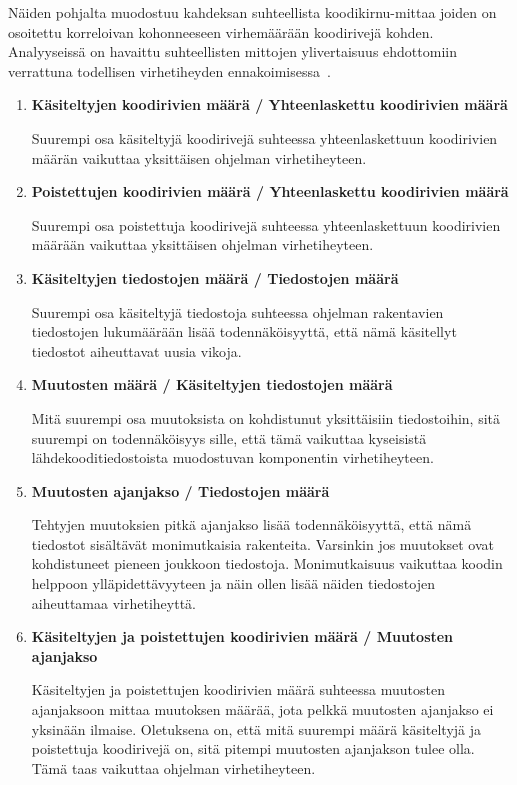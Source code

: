\documentclass[finnish]{../tktltiki2}
\theoremstyle{definition}
\theoremstyle{remark}
\begin{document}
    Näiden pohjalta muodostuu kahdeksan suhteellista koodikirnu-mittaa joiden on osoitettu korreloivan kohonneeseen 
virhemäärään koodirivejä kohden. Analyyseissä on havaittu suhteellisten mittojen ylivertaisuus ehdottomiin verrattuna 
todellisen virhetiheyden ennakoimisessa~\cite{NB05}.

\begin{enumerate}
    
    \item {\bf Käsiteltyjen koodirivien määrä / Yhteenlaskettu koodirivien määrä}
    
    Suurempi osa käsiteltyjä koodirivejä suhteessa yhteenlaskettuun koodirivien määrän vaikuttaa yksittäisen ohjelman 
    virhetiheyteen.
    
    \item {\bf Poistettujen koodirivien määrä / Yhteenlaskettu koodirivien määrä}
    
    Suurempi osa poistettuja koodirivejä suhteessa yhteenlaskettuun koodirivien määrään vaikuttaa yksittäisen ohjelman 
    virhetiheyteen.
    
    \item {\bf Käsiteltyjen tiedostojen määrä / Tiedostojen määrä}
    
    Suurempi osa käsiteltyjä tiedostoja suhteessa ohjelman rakentavien tiedostojen lukumäärään lisää todennäköisyyttä, 
    että nämä käsitellyt tiedostot aiheuttavat uusia vikoja.
    
    \item {\bf Muutosten määrä / Käsiteltyjen tiedostojen määrä}
    
    Mitä suurempi osa muutoksista on kohdistunut yksittäisiin tiedostoihin, sitä suurempi on todennäköisyys sille, että 
    tämä vaikuttaa kyseisistä lähdekooditiedostoista muodostuvan komponentin virhetiheyteen.

    \item {\bf Muutosten ajanjakso / Tiedostojen määrä}
    
    Tehtyjen muutoksien pitkä ajanjakso lisää todennäköisyyttä, että nämä tiedostot sisältävät monimutkaisia rakenteita. 
    Varsinkin jos muutokset ovat kohdistuneet pieneen joukkoon tiedostoja. Monimutkaisuus vaikuttaa koodin helppoon 
    ylläpidettävyyteen ja näin ollen lisää näiden tiedostojen aiheuttamaa virhetiheyttä.

    \item {\bf Käsiteltyjen ja poistettujen koodirivien määrä / Muutosten ajanjakso}
    
    Käsiteltyjen ja poistettujen koodirivien määrä suhteessa muutosten ajanjaksoon mittaa muutoksen määrää, jota pelkkä 
    muutosten ajanjakso ei yksinään ilmaise. Oletuksena on, että mitä suurempi määrä käsiteltyjä ja poistettuja 
    koodirivejä on, sitä pitempi muutosten ajanjakson tulee olla. Tämä taas vaikuttaa ohjelman virhetiheyteen.


\end{enumerate}
\end{document}
